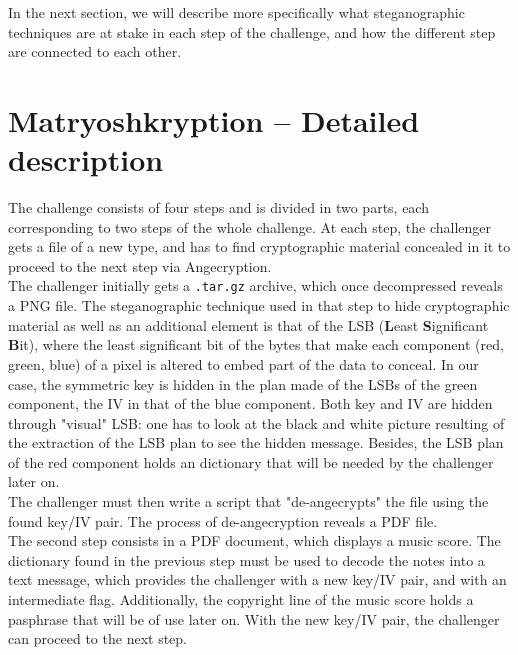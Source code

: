 \documentclass[12pt,a4paper]{article}
\begin{document}
    In the next section, we will describe more specifically what steganographic
    techniques are at stake in each step of the challenge, and how the different
    step are connected to each other.
    

\section*{Matryoshkryption -- Detailed description}
    The challenge consists of four steps and is divided in two parts, each corresponding to two steps of the whole challenge. At each step, the challenger gets a
    file of a new type, and has to find cryptographic material concealed in it
    to proceed to the next step via Angecryption.\\

    The challenger initially gets a \texttt{.tar.gz}
    archive, which once decompressed
    reveals a PNG file. The steganographic
    technique used in that step to hide
    cryptographic material as well as an
    additional element is that of the LSB
    (\textbf{L}east \textbf{S}ignificant
    \textbf{B}it), where the least
    significant bit of the bytes that make
    each component (red, green, blue) of a
    pixel is altered to embed part of the
    data to conceal. In our case, the
    symmetric key is hidden in the plan
    made of the LSBs of the green
    component, the IV in that of the blue
    component. Both key and IV are hidden
    through "visual" LSB: one has to look
    at the black and white picture
    resulting of the extraction of the LSB
    plan to see the hidden message.
    Besides, the LSB plan of the red
    component holds an dictionary that
    will be needed by the challenger later
    on.\\ \indent The challenger must then
    write a script that "de-angecrypts"
    the file using the found key/IV pair.
    The process of de-angecryption reveals
    a PDF file.\\

    The second step consists in a PDF document, which displays a music score.
    The dictionary found in the previous step must be used to decode the notes
    into a text message, which provides the challenger with a new key/IV pair,
    and with an intermediate flag. Additionally, the copyright line of the
    music score holds a pasphrase that will be of use later on. With the new
    key/IV pair, the challenger can proceed to the next step.\\
\end{document}
